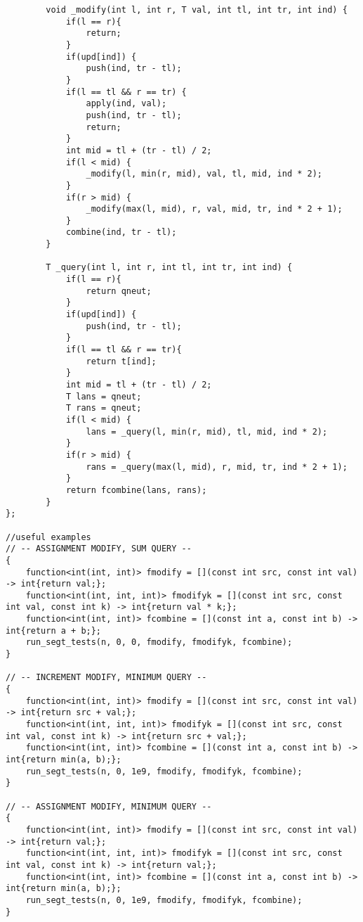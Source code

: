 \documentclass[8pt, headheight=10pt, a4paper]{article}
\begin{document}
\begin{multicols*}{3}
\begin{lstlisting}
        void _modify(int l, int r, T val, int tl, int tr, int ind) {
            if(l == r){
                return;
            }
            if(upd[ind]) {
                push(ind, tr - tl);
            }
            if(l == tl && r == tr) {
                apply(ind, val);
                push(ind, tr - tl);
                return;
            }
            int mid = tl + (tr - tl) / 2;
            if(l < mid) {
                _modify(l, min(r, mid), val, tl, mid, ind * 2);
            }
            if(r > mid) {
                _modify(max(l, mid), r, val, mid, tr, ind * 2 + 1);
            }
            combine(ind, tr - tl);
        }

        T _query(int l, int r, int tl, int tr, int ind) {
            if(l == r){
                return qneut;
            }  
            if(upd[ind]) {
                push(ind, tr - tl);
            }
            if(l == tl && r == tr){
                return t[ind];
            }
            int mid = tl + (tr - tl) / 2;
            T lans = qneut;
            T rans = qneut;
            if(l < mid) {
                lans = _query(l, min(r, mid), tl, mid, ind * 2);
            }
            if(r > mid) {
                rans = _query(max(l, mid), r, mid, tr, ind * 2 + 1);
            }
            return fcombine(lans, rans);
        }
};

//useful examples
// -- ASSIGNMENT MODIFY, SUM QUERY --
{
    function<int(int, int)> fmodify = [](const int src, const int val) -> int{return val;};
    function<int(int, int, int)> fmodifyk = [](const int src, const int val, const int k) -> int{return val * k;};
    function<int(int, int)> fcombine = [](const int a, const int b) -> int{return a + b;};
    run_segt_tests(n, 0, 0, fmodify, fmodifyk, fcombine);
}

// -- INCREMENT MODIFY, MINIMUM QUERY --
{
    function<int(int, int)> fmodify = [](const int src, const int val) -> int{return src + val;};
    function<int(int, int, int)> fmodifyk = [](const int src, const int val, const int k) -> int{return src + val;};
    function<int(int, int)> fcombine = [](const int a, const int b) -> int{return min(a, b);};
    run_segt_tests(n, 0, 1e9, fmodify, fmodifyk, fcombine);
}

// -- ASSIGNMENT MODIFY, MINIMUM QUERY --
{
    function<int(int, int)> fmodify = [](const int src, const int val) -> int{return val;};
    function<int(int, int, int)> fmodifyk = [](const int src, const int val, const int k) -> int{return val;};
    function<int(int, int)> fcombine = [](const int a, const int b) -> int{return min(a, b);};
    run_segt_tests(n, 0, 1e9, fmodify, fmodifyk, fcombine);
}


\end{lstlisting}
\end{multicols*}
\end{document}

